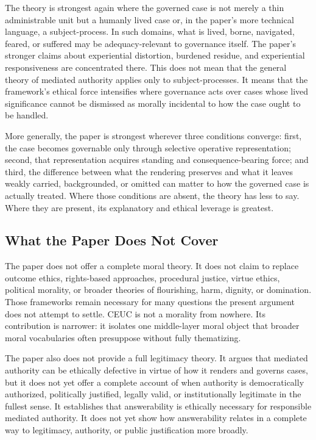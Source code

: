 \documentclass[11pt]{article}
\begin{document}
The theory is strongest again where the governed case is not merely a thin administrable unit but a humanly lived case or, in the paper's more technical language, a subject-process. In such domains, what is lived, borne, navigated, feared, or suffered may be adequacy-relevant to governance itself. The paper's stronger claims about experiential distortion, burdened residue, and experiential responsiveness are concentrated there. This does not mean that the general theory of mediated authority applies only to subject-processes. It means that the framework's ethical force intensifies where governance acts over cases whose lived significance cannot be dismissed as morally incidental to how the case ought to be handled.

More generally, the paper is strongest wherever three conditions converge: first, the case becomes governable only through selective operative representation; second, that representation acquires standing and consequence-bearing force; and third, the difference between what the rendering preserves and what it leaves weakly carried, backgrounded, or omitted can matter to how the governed case is actually treated. Where those conditions are absent, the theory has less to say. Where they are present, its explanatory and ethical leverage is greatest.

\subsection{What the Paper Does Not Cover}

The paper does not offer a complete moral theory. It does not claim to replace outcome ethics, rights-based approaches, procedural justice, virtue ethics, political morality, or broader theories of flourishing, harm, dignity, or domination. Those frameworks remain necessary for many questions the present argument does not attempt to settle. CEUC is not a morality from nowhere. Its contribution is narrower: it isolates one middle-layer moral object that broader moral vocabularies often presuppose without fully thematizing.

The paper also does not provide a full legitimacy theory. It argues that mediated authority can be ethically defective in virtue of how it renders and governs cases, but it does not yet offer a complete account of when authority is democratically authorized, politically justified, legally valid, or institutionally legitimate in the fullest sense. It establishes that answerability is ethically necessary for responsible mediated authority. It does not yet show how answerability relates in a complete way to legitimacy, authority, or public justification more broadly.
\end{document}
